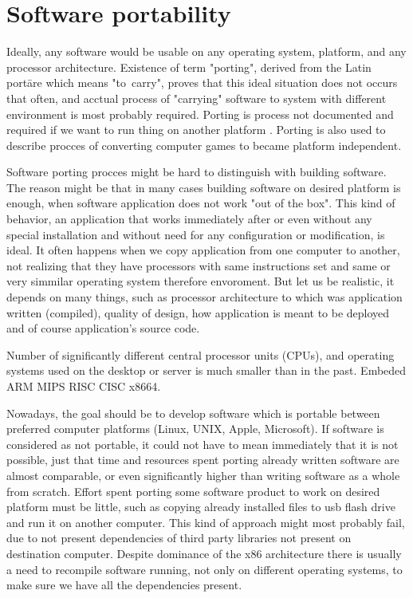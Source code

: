 \chapter{Software portability}\label{porting}

Ideally, any software would be usable on any operating system, platform, and any processor architecture.
Existence of term "porting", derived from the Latin portāre which means "to~carry", proves that this ideal situation does not occurs that often, and acctual process of "carrying" software to system with different environment is most probably required.
Porting is process not documented and required if we want to run thing on another platform \cite{porting_software}.
Porting is also used to describe procces of converting computer games to became platform independent.

Software porting procces might be hard to distinguish with building software.
The reason might be that in many cases building software on desired platform is enough, when software application does not work "out of the box".
This kind of behavior, an application that works immediately after or even without any special installation and without need for any configuration or modification, is ideal.
It often happens when we copy application from one computer to another, not realizing that they have processors with same instructions set and same or very simmilar operating system therefore envoroment.
But let us be realistic, it depends on many things, such as processor architecture to which was application written (compiled), quality of design, how application is meant to be deployed and of course application's source code.

Number of significantly different central processor units (CPUs), and operating systems used on the desktop or server is much smaller than in the past.
Embeded ARM MIPS  RISC CISC x8664.

Nowadays, the goal should be to develop software which is portable between preferred computer platforms (Linux, UNIX, Apple, Microsoft).
If software is considered as not portable, it could not have to mean immediately that it is not possible, just that time and resources spent porting already written software are almost comparable, or even significantly higher than writing software as a whole from scratch.
Effort spent porting some software product to work on desired platform must be little, such as copying already installed files to usb flash drive and run it on another computer.
This kind of approach might most probably fail, due to not present dependencies of third party libraries not present on destination computer.
Despite dominance of the x86 architecture there is usually a need to recompile software running, not only on different operating systems, to make sure we have all the dependencies present.

